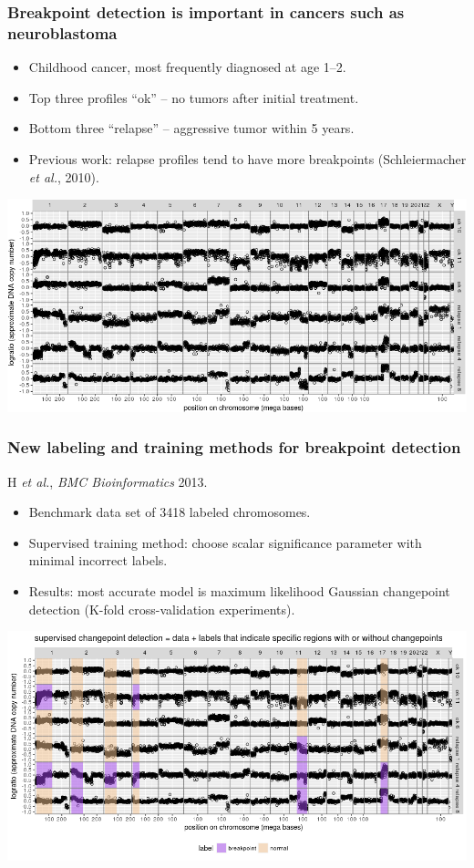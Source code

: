 \documentclass{beamer}
\begin{document}
\begin{frame}
  \frametitle{Breakpoint detection is important in cancers such as
    neuroblastoma }

  \begin{itemize}
  \item Childhood cancer, most frequently diagnosed at age 1--2.
  \item Top three profiles ``ok'' -- no tumors after initial treatment.
  \item Bottom three ``relapse'' -- aggressive tumor within 5 years.
  \item Previous work: relapse profiles tend to have more breakpoints
     (Schleiermacher {\it et al.}, 2010).
  \end{itemize}

  \includegraphics[width=\textwidth]{neuroblastoma-ok-relapse}
\end{frame}

\begin{frame}
  \frametitle{New labeling and training methods for breakpoint detection}

  H {\it et al.}, {\it BMC Bioinformatics} 2013.
  \begin{itemize}
  \item Benchmark data set of 3418 labeled chromosomes.
  \item Supervised training method: choose scalar significance parameter with
    minimal incorrect labels.
  \item Results: most accurate model is maximum likelihood Gaussian
    changepoint detection (K-fold cross-validation experiments).
  \end{itemize}

  \includegraphics[width=\textwidth]{neuroblastoma-ok-relapse-supervised}

\end{frame}
\end{document}
